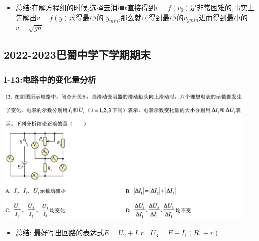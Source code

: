 \documentclass{article}
\begin{document}
\begin{itemize}
    \item 总结:\quad 在解方程组的时候,选择去消掉$t$直接得到$v = f(v_{0})$是非常困难的,事实上先解出$v = f(y)$求得最小的
          $y_{min}$,那么就可得到最小的$v_{ymin}$进而得到最小的$v = \sqrt{gh}$
\end{itemize}

\vspace{2em}


\subsection{2022-2023巴蜀中学下学期期末}
\subsubsection{I-13:电路中的变化量分析}
\includegraphics[width=0.95\textwidth,keepaspectratio]{./pictures/1.3-2.png}

\begin{itemize}
    \item 总结: \quad 最好写出回路的表达式$E = U_{2} + I_{1}r  \quad U_{3} = E - I_{1}(R_{1} + r)$
\end{itemize}

\vspace{2em}
\end{document}
